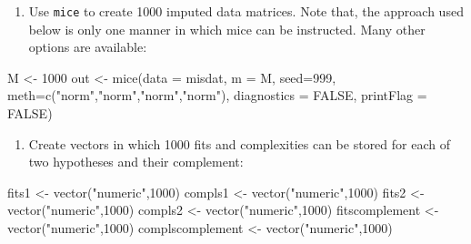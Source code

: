 \documentclass[
]{book}
\newenvironment{Shaded}{\begin{snugshade}}{\end{snugshade}}
\newcommand{\AttributeTok}[1]{\textcolor[rgb]{0.77,0.63,0.00}{#1}}
\newcommand{\ConstantTok}[1]{\textcolor[rgb]{0.00,0.00,0.00}{#1}}
\newcommand{\DecValTok}[1]{\textcolor[rgb]{0.00,0.00,0.81}{#1}}
\newcommand{\FunctionTok}[1]{\textcolor[rgb]{0.00,0.00,0.00}{#1}}
\newcommand{\NormalTok}[1]{#1}
\newcommand{\OtherTok}[1]{\textcolor[rgb]{0.56,0.35,0.01}{#1}}
\newcommand{\StringTok}[1]{\textcolor[rgb]{0.31,0.60,0.02}{#1}}
\providecommand{\tightlist}{%
  \setlength{\itemsep}{0pt}\setlength{\parskip}{0pt}}
\begin{document}
\begin{enumerate}
\def\labelenumi{\arabic{enumi})}
\tightlist
\item
  Use \texttt{mice} to create 1000 imputed data matrices. Note that, the approach used
  below is only one manner in which mice can be instructed. Many other options are available:
\end{enumerate}

\begin{Shaded}
\begin{Highlighting}[]
\NormalTok{M }\OtherTok{\textless{}{-}} \DecValTok{1000} 
\NormalTok{out }\OtherTok{\textless{}{-}} \FunctionTok{mice}\NormalTok{(}\AttributeTok{data =}\NormalTok{ misdat, }\AttributeTok{m =}\NormalTok{ M, }\AttributeTok{seed=}\DecValTok{999}\NormalTok{, }\AttributeTok{meth=}\FunctionTok{c}\NormalTok{(}\StringTok{"norm"}\NormalTok{,}\StringTok{"norm"}\NormalTok{,}\StringTok{"norm"}\NormalTok{,}\StringTok{"norm"}\NormalTok{), }\AttributeTok{diagnostics =} \ConstantTok{FALSE}\NormalTok{, }\AttributeTok{printFlag =} \ConstantTok{FALSE}\NormalTok{)}
\end{Highlighting}
\end{Shaded}

\begin{enumerate}
\def\labelenumi{\arabic{enumi})}
\setcounter{enumi}{1}
\tightlist
\item
  Create vectors in which 1000 fits and complexities can be stored for each
  of two hypotheses and their complement:
\end{enumerate}

\begin{Shaded}
\begin{Highlighting}[]
\NormalTok{fits1 }\OtherTok{\textless{}{-}} \FunctionTok{vector}\NormalTok{(}\StringTok{"numeric"}\NormalTok{,}\DecValTok{1000}\NormalTok{)}
\NormalTok{compls1 }\OtherTok{\textless{}{-}} \FunctionTok{vector}\NormalTok{(}\StringTok{"numeric"}\NormalTok{,}\DecValTok{1000}\NormalTok{)}
\NormalTok{fits2 }\OtherTok{\textless{}{-}} \FunctionTok{vector}\NormalTok{(}\StringTok{"numeric"}\NormalTok{,}\DecValTok{1000}\NormalTok{)}
\NormalTok{compls2 }\OtherTok{\textless{}{-}} \FunctionTok{vector}\NormalTok{(}\StringTok{"numeric"}\NormalTok{,}\DecValTok{1000}\NormalTok{)}
\NormalTok{fitscomplement }\OtherTok{\textless{}{-}} \FunctionTok{vector}\NormalTok{(}\StringTok{"numeric"}\NormalTok{,}\DecValTok{1000}\NormalTok{)}
\NormalTok{complscomplement }\OtherTok{\textless{}{-}} \FunctionTok{vector}\NormalTok{(}\StringTok{"numeric"}\NormalTok{,}\DecValTok{1000}\NormalTok{)}
\end{Highlighting}
\end{Shaded}
\end{document}
